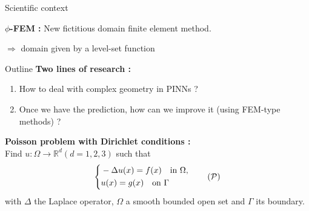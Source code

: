 \begin{frame}{Scientific context}
\begin{center}
\begin{tcolorbox}
\begin{figure}[htb]
{
				}%
			\end{figure}
		\end{tcolorbox}		
	\end{center}

	\vspace{2pt}
	\textbf{$\phi$-FEM :} New fictitious domain finite element method. \qquad {}
	
	$\Rightarrow$ domain given by a level-set function \footnotesize\citep{duprez_phi-fem_2020}\normalsize
\end{frame}

\begin{frame}{Outline}
	\textbf{Two lines of research :}
	
	\begin{enumerate}
		\item How to deal with complex geometry in PINNs ?
		\item Once we have the prediction, how can we improve it (using FEM-type methods) ?
	\end{enumerate}

	\vspace{15pt}

	\textbf{Poisson problem with Dirichlet conditions :} \\
	Find $u : \Omega \rightarrow \mathbb{R}^d (d=1,2,3)$ such that
	\begin{equation}
		\left\{\begin{aligned}
			&-\Delta u(x) = f(x) \quad \text{in } \Omega, \\
			&u(x) = g(x) \quad \text{on } \Gamma
		\end{aligned}\right. \label{edp} \tag{$\mathcal{P}$}
	\end{equation}
	with $\Delta$ the Laplace operator, $\Omega$ a smooth bounded open set and $\Gamma$ its boundary. 
\end{frame}